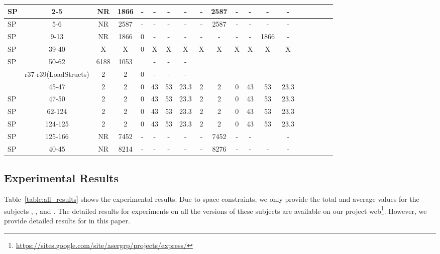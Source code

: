 \begin{table*}
\begin{CodeOut}
\begin{center}
\begin {tabular} {|l|c|c|c|c|c|c|c|c|c|c|c|c|c|c|c|c|c|c|}
\hline
SP&2-5&NR&1866&-&-&-&-&-&2587&-&-&-&-\\
\hline
SP&5-6&NR&2587&-&-&-&-&-&2587&-&-&-&-\\
\hline
SP&9-13&NR&1866&0&-&-&-&-&-&-&-&1866&-\\
\hline
SP&39-40&X&X&0&X&X&X&X&X&X&X&X&X\\
\hline
SP&50-62&6188&1053&&-&-&-&&&&&&\\
\hline
\Comment{SP&r37-r39(LoadStructs)&2&2&0&-&-&-&&&&&&\\
\hline}
SP&45-47&2&2&0&43&53&23.3&2&2&0&43&53&23.3\\
\hline
SP&47-50&2&2&0&43&53&23.3&2&2&0&43&53&23.3\\
\hline
SP&62-124&2&2&0&43&53&23.3&2&2&0&43&53&23.3\\
\hline
SP&124-125&2&2&0&43&53&23.3&2&2&0&43&53&23.3\\
\hline
SP&125-166&NR&7452&-&-&-&-&-&7452&-&-&&-\\
\hline
SP&40-45&NR&8214&-&-&-&-&-&8276&-&-&-&-\\
\hline
\end{tabular}
\end{center}
\end{CodeOut}
\end{table*}


\subsection{Experimental Results}
Table~\ref{table:all_results} shows the experimental results. Due to space constraints, we only provide the total and average values for the subjects , , and . The detailed results for experiments on all the versions of these subjects are available on our project web\footnote{\url{https://sites.google.com/site/asergrp/projects/express/}}.
However, we provide detailed results for  in this paper. 

